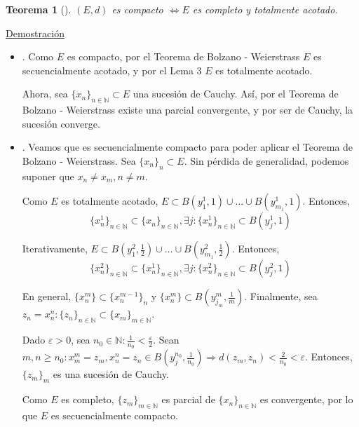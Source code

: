 \documentclass[10pt,a4paper,openright]{book}
\theoremstyle{break}
\newtheorem*{theo}{Teorema}
\begin{document}
\begin{theo}[]
$(E,d)$ es compacto $\Leftrightarrow E$ es completo y totalmente acotado.
\end{theo}

\underline{Demostración}

\begin{itemize}
\item \fbox{$\Rightarrow$}.
Como $E$ es compacto, por el Teorema de Bolzano - Weierstrass $E$ es secuencialmente acotado, y por el Lema 3 $E$ es totalmente acotado.

Ahora, sea $\{x_n\}_{n \in \mathbb{N}} \subset E$ una sucesión de Cauchy. Así, por el Teorema de Bolzano - Weierstrass existe una parcial convergente, y por ser de Cauchy, la sucesión converge.
 
\item \fbox{$\Leftarrow$}.
Veamos que es secuencialmente compacto para poder aplicar el Teorema de Bolzano - Weierstrass. Sea $\{x_n\}_n \subset E$. Sin pérdida de generalidad, podemos suponer que $x_n \neq x_m, n \neq m$.

Como $E$ es totalmente acotado, $E \subset B(y_1^1, 1) \cup \ldots \cup B(y_{m_1}^1,1)$. Entonces, 
$$\{x^1_n\}_{n \in \mathbb{N}} \subset \{x_n\}_{n \in \mathbb{N}}, \exists j : \{x_n^1\}_{n \in \mathbb{N}} \subset B(y_j^1, 1)$$

Iterativamente,  $E \subset B(y_1^2, \frac{1}{2}) \cup \ldots \cup B(y_{m_1}^2,\frac{1}{2})$. Entonces, 
$$\{x^2_n\}_{n \in \mathbb{N}} \subset \{x_n^1\}_{n \in \mathbb{N}}, \exists j : \{x_n^2\}_{n \in \mathbb{N}} \subset B(y_j^2, 1)$$

En general, $\{x_n^m\} \subset \{x_n^{m-1}\}_n$ y $\{x_n^m\} \subset B(y_{j_m}^m, \frac{1}{m})$. Finalmente, sea $z_n = x^n_n : \{z_n\}_{n \in \mathbb{N}} \subset \{x_m\}_{m \in \mathbb{N}}$.

Dado $\varepsilon > 0$, sea $n_0 \in \mathbb{N} : \frac{1}{n_0} < \frac{\varepsilon}{2}$. Sean $m,n \geq n_0 : x_m^m = z_m ,  x^n_n = z_n \in B(y_j^{n_0}, \frac{1}{n_0}) \Rightarrow d(z_m, z_n) < \frac{2}{n_0} < \varepsilon$. Entonces, $\{z_m\}_m$ es una sucesión de Cauchy. 

Como $E$ es completo, $\{z_m\}_{m \in \mathbb{N}}$ es parcial de $\{x_n\}_{n \in \mathbb{N}}$ es convergente, por lo que $E$ es secuencialmente compacto. 

\end{itemize}
\end{document}
